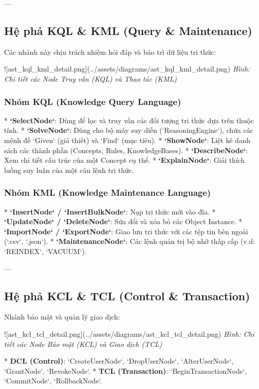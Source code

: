 ---

\subsection{Hệ phả KQL & KML (Query & Maintenance)}
Các nhánh này chịu trách nhiệm hỏi đáp và bảo trì dữ liệu tri thức:

![ast\_kql\_kml\_detail.png](../assets/diagrams/ast\_kql\_kml\_detail.png)
\textit{Hình: Chi tiết các Node Truy vấn (KQL) và Thao tác (KML)}

\subsubsection{Nhóm KQL (Knowledge Query Language)}
*   \textbf{`SelectNode`}: Dùng để lọc và truy vấn các đối tượng tri thức dựa trên thuộc tính.
*   \textbf{`SolveNode`}: Dùng cho bộ máy suy diễn (`ReasoningEngine`), chứa các mệnh đề `Given` (giả thiết) và `Find` (mục tiêu).
*   \textbf{`ShowNode`}: Liệt kê danh sách các thành phần (Concepts, Rules, KnowledgeBases).
*   \textbf{`DescribeNode`}: Xem chi tiết cấu trúc của một Concept cụ thể.
*   \textbf{`ExplainNode`}: Giải thích luồng suy luận của một câu lệnh tri thức.

\subsubsection{Nhóm KML (Knowledge Maintenance Language)}
*   \textbf{`InsertNode` / `InsertBulkNode`}: Nạp tri thức mới vào đĩa.
*   \textbf{`UpdateNode` / `DeleteNode`}: Sửa đổi và xóa bỏ các Object Instance.
*   \textbf{`ImportNode` / `ExportNode`}: Giao lưu tri thức với các tệp tin bên ngoài (`.csv`, `.json`).
*   \textbf{`MaintenanceNode`}: Các lệnh quản trị bộ nhớ thấp cấp (v.d: `REINDEX`, `VACUUM`).

---

\subsection{Hệ phả KCL & TCL (Control & Transaction)}
Nhánh bảo mật và quản lý giao dịch:

![ast\_kcl\_tcl\_detail.png](../assets/diagrams/ast\_kcl\_tcl\_detail.png)
\textit{Hình: Chi tiết các Node Bảo mật (KCL) và Giao dịch (TCL)}

*   \textbf{DCL (Control)}: `CreateUserNode`, `DropUserNode`, `AlterUserNode`, `GrantNode`, `RevokeNode`.
*   \textbf{TCL (Transaction)}: `BeginTransactionNode`, `CommitNode`, `RollbackNode`.

